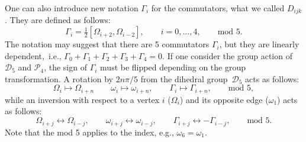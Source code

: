 \documentclass[pdftex]{sigma}
\numberwithin{equation}{section}
\begin{document}
One can also introduce new notation $\Gamma_i$ for the commutators, what we called $D_{ijk}$. They are defined as follows:
\[
\Gamma_i=\tfrac{1}{2}[\Omega_{i+2},\Omega_{i-2}],\qquad i=0,\dots,4,\qquad\mbox{mod }5.
\]
The notation may suggest that there are 5 commutators $\Gamma_i$, but they are linearly dependent,~i.e.,
$
\Gamma_0+\Gamma_1+\Gamma_2+\Gamma_3+\Gamma_4=0$.
If one consider the group action of $\mathcal{D}_5$ and $\mathcal{P}_4$, the sign of $\Gamma_i$ must be flipped depending on the group transformation. A rotation by $2n\pi/5$ from the dihedral group~$\mathcal{D}_5$ acts as follows:
\[
 \Omega_i\mapsto \Omega_{i+n}\qquad\omega_i\mapsto\omega_{i+n},\qquad \Gamma_i\mapsto \Gamma_{i+n},\qquad\mbox{mod }5,
\]
while an inversion with respect to a vertex $i$ ($\Omega_i$) and its opposite edge ($\omega_1$) acts as follows:
\[
\Omega_{i+j}\longleftrightarrow\Omega_{i-j},\qquad\omega_{i+j}\longleftrightarrow\omega_{i-j},\qquad\Gamma_{i+j}\longleftrightarrow -\Gamma_{i-j},\qquad\mbox{mod }5.
\]
Note that the mod 5 applies to the index, e.g., $\omega_6=\omega_1$.
\end{document}
